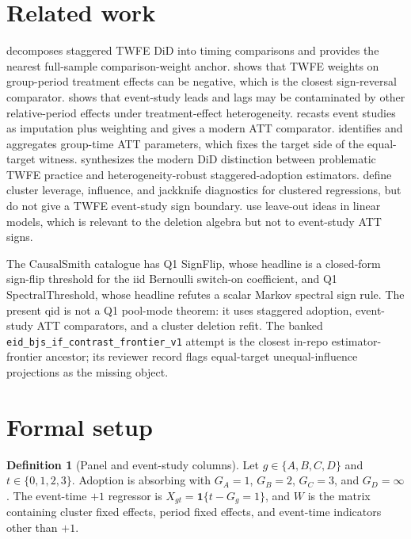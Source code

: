 \documentclass[11pt]{article}
\newcommand{\one}{\mathbf{1}}
\theoremstyle{definition}
\newtheorem{definition}{Definition}
\theoremstyle{plain}
\theoremstyle{remark}
\begin{document}
\section{Related work}
\citet{goodman_bacon_2021_joe} decomposes staggered TWFE DiD into timing comparisons and provides the nearest full-sample comparison-weight anchor.  \citet{dechaisemartin_dhaultfoeuille_2020_aer} shows that TWFE weights on group-period treatment effects can be negative, which is the closest sign-reversal comparator.  \citet{sun_abraham_2021_joe} shows that event-study leads and lags may be contaminated by other relative-period effects under treatment-effect heterogeneity.  \citet{borusyak_jaravel_spiess_2024_restud} recasts event studies as imputation plus weighting and gives a modern ATT comparator.  \citet{callaway_santanna_2021_joe} identifies and aggregates group-time ATT parameters, which fixes the target side of the equal-target witness.  \citet{roth_santanna_bilinski_poe_2023_joe} synthesizes the modern DiD distinction between problematic TWFE practice and heterogeneity-robust staggered-adoption estimators.  \citet{mackinnon_nielsen_webb_2023_stata} define cluster leverage, influence, and jackknife diagnostics for clustered regressions, but do not give a TWFE event-study sign boundary.  \citet{kline_saggio_solvesen_2020_econometrica} use leave-out ideas in linear models, which is relevant to the deletion algebra but not to event-study ATT signs.

The CausalSmith catalogue has Q1 SignFlip, whose headline is a closed-form sign-flip threshold for the iid Bernoulli switch-on coefficient, and Q1 SpectralThreshold, whose headline refutes a scalar Markov spectral sign rule.  The present qid is not a Q1 pool-mode theorem: it uses staggered adoption, event-study ATT comparators, and a cluster deletion refit.  The banked \texttt{eid\_bjs\_if\_contrast\_frontier\_v1} attempt is the closest in-repo estimator-frontier ancestor; its reviewer record flags equal-target unequal-influence projections as the missing object.

\section{Formal setup}
\begin{definition}[Panel and event-study columns]
Let \(g\in\{A,B,C,D\}\) and \(t\in\{0,1,2,3\}\).  Adoption is absorbing with \(G_A=1\), \(G_B=2\), \(G_C=3\), and \(G_D=\infty\).  The event-time \(+1\) regressor is \(X_{gt}=\one\{t-G_g=1\}\), and \(W\) is the matrix containing cluster fixed effects, period fixed effects, and event-time indicators other than \(+1\).
\end{definition}
\end{document}
